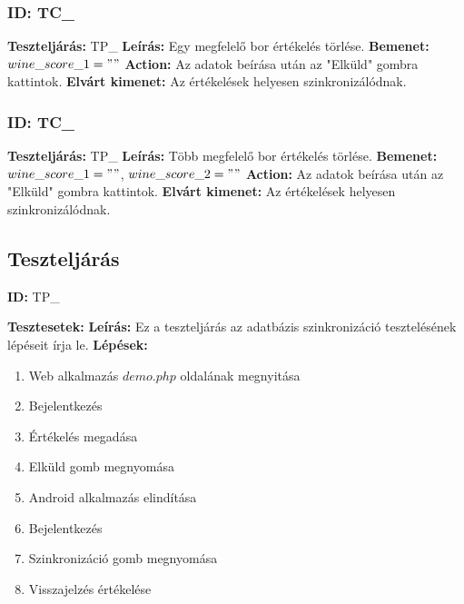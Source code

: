 \documentclass[12pt]{report}
\theoremstyle{definition}
\begin{document}
	\subsubsection{ID: TC\_}\addtocounter{TC}{1}
	\textbf{Teszteljárás:} TP\_
	\newline 
	\textbf{Leírás:} Egy megfelelő bor értékelés törlése.
	\newline 
	\textbf{Bemenet:} $wine\_score\_1 = ""$
	\newline 
	\textbf{Action:} Az adatok beírása után az "Elküld" gombra kattintok.
	\newline 
	\textbf{Elvárt kimenet:} Az értékelések helyesen szinkronizálódnak.
	
	\subsubsection{ID: TC\_}\addtocounter{TC}{1}
	\textbf{Teszteljárás:} TP\_
	\newline 
	\textbf{Leírás:} Több megfelelő bor értékelés törlése.
	\newline 
	\textbf{Bemenet:} $wine\_score\_1 = ""$, $wine\_score\_2 = ""$
	\newline 
	\textbf{Action:} Az adatok beírása után az "Elküld" gombra kattintok.
	\newline 
	\textbf{Elvárt kimenet:} Az értékelések helyesen szinkronizálódnak.
	
	
	\setcounter{TPTCStop}{\value{TC}}
	\subsection{Teszteljárás}
	
	\textbf{ID:}  TP\_\addtocounter{TP}{1}
	\newline
	\textbf{Tesztesetek:} 
	\newline
	\textbf{Leírás:} Ez a teszteljárás az adatbázis szinkronizáció tesztelésének lépéseit írja le.
	\newline
	\textbf{Lépések:}
	\begin{enumerate}
		\item Web alkalmazás $demo.php$ oldalának megnyitása
		\item Bejelentkezés
		\item Értékelés megadása
		\item Elküld gomb megnyomása
		\item Android alkalmazás elindítása
		\item Bejelentkezés
		\item Szinkronizáció gomb megnyomása
		\item Visszajelzés értékelése 
	\end{enumerate}
	
\end{document}
